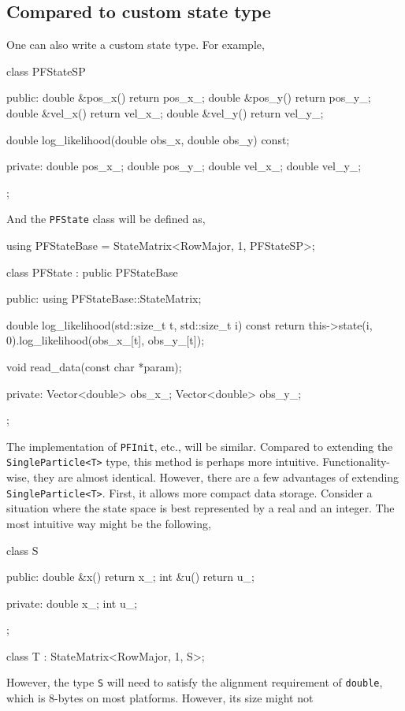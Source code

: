 \subsection{Compared to custom state type}
\label{sub:Compared to custom state type}

One can also write a custom state type. For example,
\begin{cppcode}
  class PFStateSP
  {
      public:
      double &pos_x() { return pos_x_; }
      double &pos_y() { return pos_y_; }
      double &vel_x() { return vel_x_; }
      double &vel_y() { return vel_y_; }

      double log_likelihood(double obs_x, double obs_y) const;

      private:
      double pos_x_;
      double pos_y_;
      double vel_x_;
      double vel_y_;
  };
\end{cppcode}
And the \verb|PFState| class will be defined as,
\begin{cppcode}
  using PFStateBase = StateMatrix<RowMajor, 1, PFStateSP>;

  class PFState : public PFStateBase
  {
      public:
      using PFStateBase::StateMatrix;

      double log_likelihood(std::size_t t, std::size_t i) const
      {
          return this->state(i, 0).log_likelihood(obs_x_[t], obs_y_[t]);
      }

      void read_data(const char *param);

      private:
      Vector<double> obs_x_;
      Vector<double> obs_y_;
  };
\end{cppcode}
The implementation of \verb|PFInit|, etc., will be similar. Compared to
extending the \verb|SingleParticle<T>| type, this method is perhaps more
intuitive. Functionality-wise, they are almost identical. However, there are a
few advantages of extending \verb|SingleParticle<T>|. First, it allows more
compact data storage. Consider a situation where the state space is best
represented by a real and an integer. The most intuitive way might be the
following,
\begin{cppcode}
  class S
  {
      public:
      double &x() { return x_; }
      int &u() { return u_; }

      private:
      double x_;
      int u_;
  };

  class T : StateMatrix<RowMajor, 1, S>;
\end{cppcode}
However, the type \verb|S| will need to satisfy the alignment requirement of
\verb|double|, which is 8-bytes on most platforms. However, its size might not

